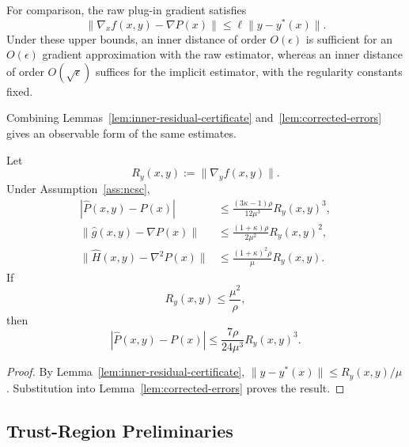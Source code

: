 For comparison, the raw plug-in gradient satisfies
\begin{equation}
    \|\nabla_xf(x,y)-\nabla P(x)\|
    \le
    \ell\|y-y^*(x)\|.
    \label{eq:raw-gradient-error}
\end{equation}
Under these upper bounds, an inner distance of order $O(\epsilon)$
is sufficient for an $O(\epsilon)$ gradient approximation with the
raw estimator, whereas an inner distance of order
$O(\sqrt{\epsilon})$ suffices for the implicit estimator, with the
regularity constants fixed.

Combining Lemmas~\ref{lem:inner-residual-certificate}
and~\ref{lem:corrected-errors} gives an observable form of the same
estimates.

\begin{corollary}
\label{cor:residual-estimator-bounds}
Let
\[
    R_y(x,y):=\|\nabla_yf(x,y)\|.
\]
Under Assumption~\ref{ass:ncsc},
\begin{subequations}
\label{eq:residual-estimator-bounds}
\begin{align}
    |\widehat P(x,y)-P(x)|
    &\le
    \frac{(3\kappa-1)\rho}{12\mu^3}
    R_y(x,y)^3,
    \label{eq:residual-value-bound}
    \\
    \|\widehat g(x,y)-\nabla P(x)\|
    &\le
    \frac{(1+\kappa)\rho}{2\mu^2}
    R_y(x,y)^2,
    \label{eq:residual-gradient-bound}
    \\
    \|\widehat H(x,y)-\nabla^2P(x)\|
    &\le
    \frac{(1+\kappa)^2\rho}{\mu}
    R_y(x,y).
    \label{eq:residual-hessian-bound}
\end{align}
\end{subequations}
If
\begin{equation}
    R_y(x,y)\le\frac{\mu^2}{\rho},
    \label{eq:residual-local-region}
\end{equation}
then
\begin{equation}
    |\widehat P(x,y)-P(x)|
    \le
    \frac{7\rho}{24\mu^3}R_y(x,y)^3.
    \label{eq:residual-local-value-bound}
\end{equation}
\end{corollary}

\begin{proof}
By Lemma~\ref{lem:inner-residual-certificate},
$\|y-y^*(x)\|\le R_y(x,y)/\mu$.
Substitution into Lemma~\ref{lem:corrected-errors} proves the result.
\end{proof}


\subsection{Trust-Region Preliminaries}
\label{sec:tr-preliminaries}

